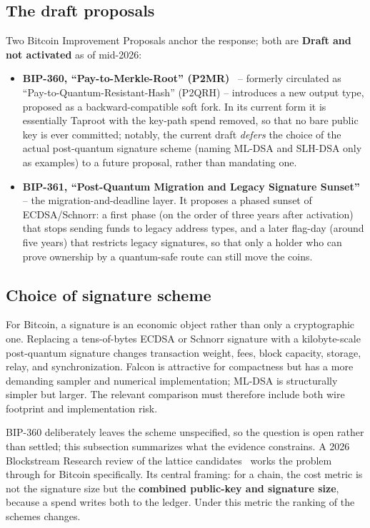 \subsection{The draft proposals}
Two Bitcoin Improvement Proposals anchor the response; both are \textbf{Draft and not activated} as of mid-2026:

\begin{itemize}
  \item \textbf{BIP-360, ``Pay-to-Merkle-Root'' (P2MR)}~\cite{bip360} -- formerly circulated as ``Pay-to-Quantum-Resistant-Hash'' (P2QRH) -- introduces a new output type, proposed as a backward-compatible soft fork. In its current form it is essentially Taproot with the key-path spend removed, so that no bare public key is ever committed; notably, the current draft \emph{defers} the choice of the actual post-quantum signature scheme (naming ML-DSA and SLH-DSA only as examples) to a future proposal, rather than mandating one.
  \item \textbf{BIP-361, ``Post-Quantum Migration and Legacy Signature Sunset''}~\cite{bip361} -- the migration-and-deadline layer. It proposes a phased sunset of ECDSA/Schnorr: a first phase (on the order of three years after activation) that stops sending funds to legacy address types, and a later flag-day (around five years) that restricts legacy signatures, so that only a holder who can prove ownership by a quantum-safe route can still move the coins.
\end{itemize}

\subsection{Choice of signature scheme}
\label{sec:bitcoin-scheme-choice}

For Bitcoin, a signature is an economic object rather than only a cryptographic
one. Replacing a tens-of-bytes ECDSA or Schnorr signature with a kilobyte-scale
post-quantum signature changes transaction weight, fees, block capacity, storage,
relay, and synchronization. Falcon is attractive for compactness but has a more
demanding sampler and numerical implementation; ML-DSA is structurally simpler but
larger. The relevant comparison must therefore include both wire footprint and
implementation risk.

BIP-360 deliberately leaves the scheme unspecified, so the question is open
rather than settled; this subsection summarizes what the evidence constrains. A 2026 Blockstream Research review of the lattice
candidates~\cite{blockstreamlattice2026} works the problem through for Bitcoin
specifically. Its central framing: for a chain, the cost metric is not the
signature size but the \textbf{combined public-key and signature size}, because
a spend writes both to the ledger. Under this metric the ranking of the schemes
changes.

